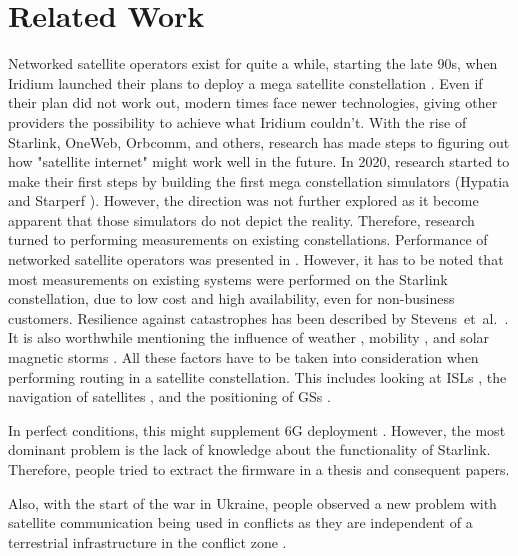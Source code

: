 \section{Related Work} \label{sec:related-work}

Networked satellite operators exist for quite a while, starting the late 90s,
when Iridium launched their plans to deploy a mega satellite constellation
\cite{Chan2002}. Even if their plan did not work out, modern times face newer
technologies, giving other providers the possibility to achieve what Iridium
couldn't. With the rise of Starlink, OneWeb, Orbcomm, and others, research has
made steps to figuring out how "satellite internet" might work well in the
future. In 2020, research started to make their first steps by building the
first mega constellation simulators (Hypatia and Starperf
\cite{DBLP:conf/icnp/LaiLL20, DBLP:conf/imc/KassingBASS20}). However, the
direction was not further explored as it become apparent that those simulators
do not depict the reality. Therefore, research turned to performing
measurements on existing constellations. Performance of networked satellite
operators was presented in \cite{Segan2020, DBLP:conf/infocom/MaCZCML23,
	Pekhterev2021, DBLP:journals/pacmnet/RamanVCSZ23, DBLP:conf/leo-net/0001SCB23,
	DBLP:conf/imc/MichelTGB22, DBLP:conf/www/MohanFCBRMO24, Izhikevich2024,
	Omorogiuwa2024}. However, it has to be noted that most measurements on existing
systems were performed on the Starlink constellation, due to low cost and high
availability, even for non-business customers. Resilience against catastrophes
has been described by Stevens~et~al.~\cite{DBLP:conf/pam/StevensIBD24}. It is
also worthwhile mentioning the influence of weather
\cite{DBLP:conf/tma/LaniewskiLMRA24}, mobility
\cite{DBLP:journals/corr/abs-2403-13497}, and solar magnetic storms
\cite{DBLP:conf/infocom/MaCZCML23, Fang2022, Hapgood2022}. All these factors
have to be taken into consideration when performing routing
\cite{DBLP:conf/hotnets/Handley18, DBLP:journals/comcom/ZhangY22,
	DBLP:conf/pam/BhosaleSBG23} in a satellite constellation. This includes looking
at \ac{ISL}s \cite{DBLP:conf/hotnets/HauriBGS20, Stock2022}, the navigation of
satellites \cite{DBLP:conf/plans/KassasKKSHNKK23,DBLP:conf/iotbd/ShortenKR24},
and the positioning of \ac{GS}s \cite{DBLP:conf/sigcomm/VasishtSC21}.

In perfect conditions, this might supplement 6G deployment
\cite{DBLP:journals/cm/LinCCCHB21}. However, the most dominant problem is the
lack of knowledge about the functionality of Starlink. Therefore, people tried
to extract the firmware \cite{WoutersDumpingUserTerminalFirmware,
	QuarkslabsBlogUserTerminalFirmsware} in a thesis and consequent papers.

Also, with the start of the war in Ukraine, people observed a new problem with
satellite communication being used in conflicts as they are independent of a
terrestrial infrastructure in the conflict zone \cite{Lab2024, Walsh2024,
	Abels2024}.
